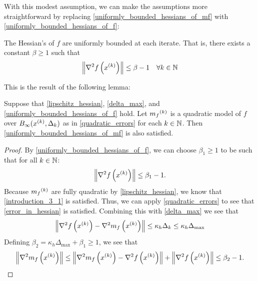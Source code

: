 With this modest assumption, we can make the assumptions more straightforward by replacing \cref{uniformly_bounded_hessians_of_mf} with \cref{uniformly_bounded_hessians_of_f}:

\begin{assumption}
\label{uniformly_bounded_hessians_of_f}
The Hessian's of $f$ are uniformly bounded at each iterate. That is, there exists a constant $\beta \ge 1$ such that
\begin{align*}
\left\|\nabla^2 f\left(x^{(k)}\right)\right\| \le \beta - 1\quad \forall k \in \mathbb N
\end{align*}
\end{assumption}


This is the result of the following lemma:
\begin{lemma}
\label{replacing_h3}
Suppose that \cref{lipschitz_hessian}, \cref{delta_max}, and \cref{uniformly_bounded_hessians_of_f} hold.
Let ${{m}_f}^{(k)}$ is a quadratic model of $f$ over $B_{\infty}(x^{(k)}, \Delta_k)$  as in \cref{quadratic_errors} for each $k \in \mathbb N$.
Then \cref{uniformly_bounded_hessians_of_mf} is also satisfied.
\end{lemma}

\begin{proof}
By \cref{uniformly_bounded_hessians_of_f}, we can choose $\beta_1 \ge 1$ to be such that for all $k \in\mathbb N$:
\begin{align*}
\left\|\nabla^2 f\left(x^{(k)}\right) \right\| \le \beta_1 - 1.
\end{align*}
Because ${{m}_f}^{(k)}$ are fully quadratic by \cref{lipschitz_hessian}, we know that \cref{introduction_3_1} is satisfied.
Thus, we can apply \cref{quadratic_errors} to see that \cref{error_in_hessian} is satisfied.
Combining this with \cref{delta_max} we see that
\begin{align*}
\left\|\nabla^2 f\left(x^{(k)}\right) - \nabla^2 m_f\left(x^{(k)}\right) \right\| \le \kappa_{h} \Delta_k \le \kappa_{h} \Delta_{\text{max}}
\end{align*}
Defining $\beta_2 = \kappa_{h} \Delta_{\text{max}} + \beta_1 \ge 1$, we see that
\begin{align*}
\left\|\nabla^2 m_{f}\left(x^{(k)}\right)\right\| \le \left\|\nabla^2 m_{f}\left(x^{(k)}\right) - \nabla^2 f\left(x^{(k)}\right)  \right\| + \left\|\nabla^2 f\left(x^{(k)}\right) \right\|
\le \beta_2 - 1 .
\end{align*}
\end{proof}



